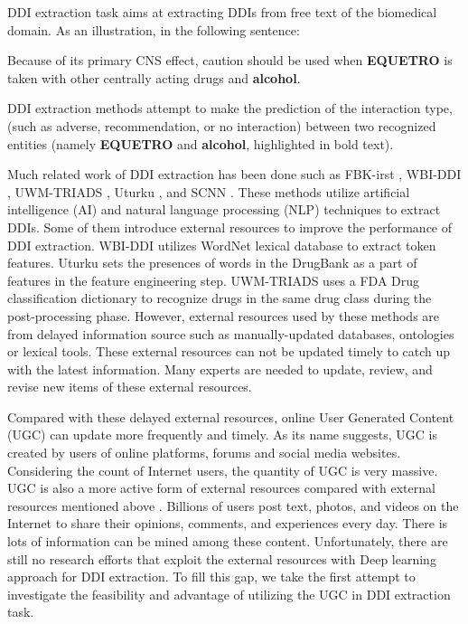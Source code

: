 \documentclass[conference]{IEEEtran}
\begin{document}
DDI extraction task aims at extracting DDIs from free text of the biomedical domain.
As an illustration, in the following sentence:

\begin{framed}
Because of its primary CNS effect, caution should be used when \textbf{EQUETRO}
is taken with other centrally acting drugs and \textbf{alcohol}.
\end{framed}

\noindent DDI extraction methods attempt to make the prediction of the interaction type,
(such as adverse, recommendation, or no interaction) between
two recognized entities (namely \textbf{EQUETRO} and \textbf{alcohol}, highlighted in bold text).

Much related work of DDI extraction has been done such as FBK-irst 
\cite{chowdhury_fbk-irst:_2013}, WBI-DDI \cite{thomas_wbi-ddi:_2013},
UWM-TRIADS \cite{rastegar-mojarad_uwm-triads:_2013},
Uturku \cite{bjorne_uturku:_2013}, 
and SCNN \cite{zhao_drug_2016}.
These methods utilize artificial intelligence (AI) and natural language processing (NLP) techniques to extract
DDIs.
Some of them introduce external resources to improve the performance of DDI extraction.
WBI-DDI utilizes WordNet lexical database to extract token features.
Uturku sets the presences of words in the DrugBank as a part of features in the 
feature engineering step.
UWM-TRIADS uses a FDA Drug classification dictionary to recognize drugs in the same
drug class during the post-processing phase.
However, external resources used by these methods are from delayed information source such 
as manually-updated databases, ontologies or lexical tools.
These external resources can not be updated timely to catch up with the latest
information.
Many experts are needed to update, review, and revise new items of these external resources.

Compared with these delayed external resources, online User Generated Content (UGC) \cite{krumm_user-generated_2008}
can update more frequently and timely.
As its name suggests, UGC is created by users of online platforms, forums and social media websites.
Considering the count of Internet users, the quantity of UGC is very massive.
UGC is also a more active form of external resources compared with external resources mentioned above \cite{duan_mining_2013}.
Billions of users post text, photos, and videos on the Internet to share their opinions, comments, and experiences every day.
There is lots of information can be mined among these content.
Unfortunately, there are still no research efforts that exploit the external resources with Deep learning approach for DDI extraction. 
To fill this gap, we take the first attempt to investigate the feasibility and advantage of utilizing the UGC in DDI extraction task.
\end{document}
